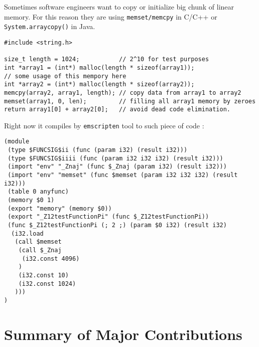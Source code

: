 Sometimes software engineers want to copy or initialize big chunk of linear memory.
For this reason they are using \texttt{memset/memcpy} in C/C++ or \texttt{System.arraycopy()} in Java. 
\begin{verbatim}
#include <string.h>

size_t length = 1024;           // 2^10 for test purposes
int *array1 = (int*) malloc(length * sizeof(array1));
// some usage of this mempory here
int *array2 = (int*) malloc(length * sizeof(array2));
memcpy(array2, array1, length); // copy data from array1 to array2
memset(array1, 0, len);         // filling all array1 memory by zeroes 
return array1[0] + array2[0];   // avoid dead code elimination.
\end{verbatim}

Right now it compiles by \texttt{emscripten} tool to such piece of code :

\begin{verbatim}
(module
 (type $FUNCSIG$ii (func (param i32) (result i32)))
 (type $FUNCSIG$iiii (func (param i32 i32 i32) (result i32)))
 (import "env" "_Znaj" (func $_Znaj (param i32) (result i32)))
 (import "env" "memset" (func $memset (param i32 i32 i32) (result i32)))
 (table 0 anyfunc)
 (memory $0 1)
 (export "memory" (memory $0))
 (export "_Z12testFunctionPi" (func $_Z12testFunctionPi))
 (func $_Z12testFunctionPi (; 2 ;) (param $0 i32) (result i32)
  (i32.load
   (call $memset
    (call $_Znaj
     (i32.const 4096)
    )
    (i32.const 10)
    (i32.const 1024)
   )))
)
\end{verbatim}


\section{Summary of Major Contributions}
